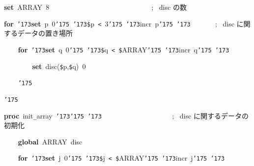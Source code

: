 \documentclass[a4paper,10pt]{article}
\def\mc{\relax}
\begin{document}
\noindent
\mbox{}\hfill

\noindent
\mbox{}\textbf{set}{\tt\mc \ }ARRAY{\tt\mc \ }8{\tt\mc \ }{\tt\mc \ }{\tt\mc \ }{\tt\mc \ }{\tt\mc \ }{\tt\mc \ }{\tt\mc \ }{\tt\mc \ }{\tt\mc \ }{\tt\mc \ }{\tt\mc \ }{\tt\mc \ }{\tt\mc \ }{\tt\mc \ }{\tt\mc \ }{\tt\mc \ }{\tt\mc \ }{\tt\mc \ }{\tt\mc \ }{\tt\mc \ }{\tt\mc \ }{\tt\mc \ }{\tt\mc \ }{\tt\mc \ }{\tt\mc \ }{\tt\mc \ }{\tt\mc \ }{\tt\mc \ }{\tt\mc \ };\rm\mc {\tt\#} \ disc の数 \hfill 
\tt\mc 

\noindent
\mbox{}\hfill

\noindent
\mbox{}\textbf{for}{\tt\mc \ }{\tt\char'173}\textbf{set}{\tt\mc \ }p{\tt\mc \ }0{\tt\char'175}{\tt\mc \ }{\tt\char'173}{\tt\$}p{\tt\mc \ }{\tt <}{\tt\mc \ }3{\tt\char'175}{\tt\mc \ }{\tt\char'173}incr{\tt\mc \ }p{\tt\char'175}{\tt\mc \ }{\tt\char'173}{\tt\mc \ }{\tt\mc \ }{\tt\mc \ }{\tt\mc \ }{\tt\mc \ }{\tt\mc \ }{\tt\mc \ };\rm\mc {\tt\#} \ disc に関するデータの置き場所\hfill 
\tt\mc 

\noindent
\mbox{}{\tt\mc \ }{\tt\mc \ }{\tt\mc \ }{\tt\mc \ }\textbf{for}{\tt\mc \ }{\tt\char'173}\textbf{set}{\tt\mc \ }q{\tt\mc \ }0{\tt\char'175}{\tt\mc \ }{\tt\char'173}{\tt\$}q{\tt\mc \ }{\tt <}{\tt\mc \ }{\tt\$}ARRAY{\tt\char'175}{\tt\mc \ }{\tt\char'173}incr{\tt\mc \ }q{\tt\char'175}{\tt\mc \ }{\tt\char'173}

\noindent
\mbox{}{\tt\mc \ }{\tt\mc \ }{\tt\mc \ }{\tt\mc \ }{\tt\mc \ }{\tt\mc \ }{\tt\mc \ }{\tt\mc \ }\textbf{set}{\tt\mc \ }disc({\tt\$}p,{\tt\$}q){\tt\mc \ }0

\noindent
\mbox{}{\tt\mc \ }{\tt\mc \ }{\tt\mc \ }{\tt\mc \ }{\tt\char'175}

\noindent
\mbox{}{\tt\char'175}

\noindent
\mbox{}\hfill

\noindent
\mbox{}\textbf{proc}{\tt\mc \ }init{\tt\_}array{\tt\mc \ }{\tt\char'173}{\tt\char'175}{\tt\mc \ }{\tt\char'173}{\tt\mc \ }{\tt\mc \ }{\tt\mc \ }{\tt\mc \ }{\tt\mc \ }{\tt\mc \ }{\tt\mc \ }{\tt\mc \ }{\tt\mc \ }{\tt\mc \ }{\tt\mc \ }{\tt\mc \ }{\tt\mc \ }{\tt\mc \ }{\tt\mc \ }{\tt\mc \ }{\tt\mc \ }{\tt\mc \ }{\tt\mc \ }{\tt\mc \ };\rm\mc {\tt\#} \ disc に関するデータの初期化\hfill 
\tt\mc 

\noindent
\mbox{}{\tt\mc \ }{\tt\mc \ }{\tt\mc \ }{\tt\mc \ }\textbf{global}{\tt\mc \ }ARRAY{\tt\mc \ }disc

\noindent
\mbox{}{\tt\mc \ }{\tt\mc \ }{\tt\mc \ }{\tt\mc \ }\textbf{for}{\tt\mc \ }{\tt\char'173}\textbf{set}{\tt\mc \ }j{\tt\mc \ }0{\tt\char'175}{\tt\mc \ }{\tt\char'173}{\tt\$}j{\tt\mc \ }{\tt <}{\tt\mc \ }{\tt\$}ARRAY{\tt\char'175}{\tt\mc \ }{\tt\char'173}incr{\tt\mc \ }j{\tt\char'175}{\tt\mc \ }{\tt\char'173}
\end{document}
